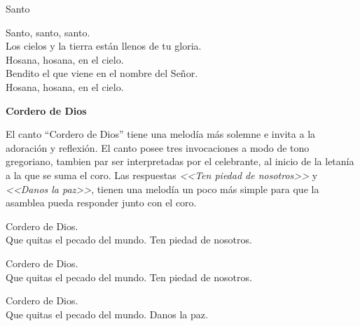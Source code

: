 \documentclass[12pt, letterpaper]{report}
\begin{document}
    \noindent
    \LARGE Santo

    \noindent
    \LARGE Santo, santo, santo. \\
    Los cielos y la tierra est\'an llenos de tu gloria.\\
    Hosana, hosana, en el cielo.\\
    Bendito el que viene en el nombre del Se\~nor. \\
    Hosana, hosana, en el cielo.
    \clearpage

    {%
\parindent 0pt
\noindent
\ifx\preLilyPondExample \undefined
\else
  \expandafter\preLilyPondExample
\fi
\def\lilypondbook{}%
%
\ifx\postLilyPondExample \undefined
\else
  \expandafter\postLilyPondExample
\fi
}
    \clearpage

    {%
\parindent 0pt
\noindent
\ifx\preLilyPondExample \undefined
\else
  \expandafter\preLilyPondExample
\fi
\def\lilypondbook{}%
%
\ifx\postLilyPondExample \undefined
\else
  \expandafter\postLilyPondExample
\fi
}
    \clearpage

    {%
\parindent 0pt
\noindent
\ifx\preLilyPondExample \undefined
\else
  \expandafter\preLilyPondExample
\fi
\def\lilypondbook{}%
%
\ifx\postLilyPondExample \undefined
\else
  \expandafter\postLilyPondExample
\fi
}
    \clearpage

    \begin{center}
      \LARGE \textbf{Cordero de Dios}
    \end{center}

    \Large El canto ``Cordero de Dios'' tiene una melod\'ia m\'as solemne e invita a la adoraci\'on y reflexi\'on. El canto posee tres invocaciones a modo de tono gregoriano, tambien par ser interpretadas por el celebrante, al inicio de la letan\'ia a la que se suma el coro. Las respuestas \textit{<<Ten piedad de nosotros>>} y \textit{<<Danos la paz>>}, tienen una melod\'ia un poco m\'as simple para que la asamblea pueda responder junto con el coro.

    \noindent
    \LARGE Cordero de Dios.\\
    Que quitas el pecado del mundo. Ten piedad de nosotros.

    \noindent
    \LARGE Cordero de Dios.\\
    Que quitas el pecado del mundo. Ten piedad de nosotros.

    \noindent
    \LARGE Cordero de Dios.\\
    Que quitas el pecado del mundo. Danos la paz.
    \clearpage
\end{document}
